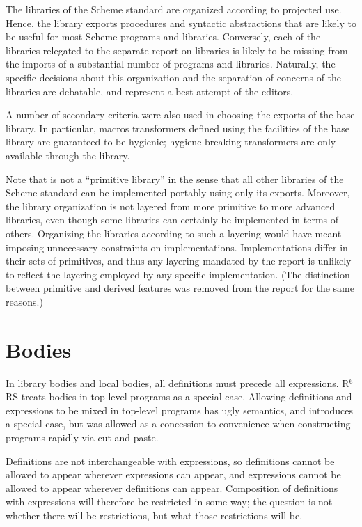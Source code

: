 \documentclass[twoside,twocolumn]{algol60}
\newcommand{\rn}[1]{R$^{#1}$RS}
\begin{document}
The libraries of the Scheme standard are organized according to
projected use.  Hence, the  library exports
procedures and syntactic abstractions that are likely to be useful for
most Scheme programs and libraries.  Conversely, each of the libraries
relegated to the separate report on libraries is likely to be missing
from the imports of a substantial number of programs and libraries.
Naturally, the specific decisions about this organization and the
separation of concerns of the libraries are debatable, and represent a
best attempt of the editors.

A number of secondary criteria were also used in choosing the exports
of the base library.  In particular, macros transformers defined using
the facilities of the base library are guaranteed to be hygienic;
hygiene-breaking transformers are only available through the
 library.

Note that  is not a ``primitive library'' in the
sense that all other libraries of the Scheme standard can be
implemented portably using only its exports.  Moreover, the library
organization is not layered from more primitive to more advanced
libraries, even though some libraries can certainly be implemented in
terms of others.  Organizing the libraries according to such a
layering would have meant imposing unnecessary constraints on
implementations.  Implementations differ in their sets of primitives,
and thus any layering mandated by the report is unlikely to reflect
the layering employed by any specific implementation.  (The
distinction between primitive and derived features was removed from
the report for the same reasons.)

\section{Bodies}

In library bodies and local bodies, all definitions must precede all
expressions. \rn{6} treats bodies in top-level programs as a special
case.  Allowing definitions and expressions to be mixed in top-level
programs has ugly semantics, and introduces a special case, but was
allowed as a concession to convenience when constructing programs
rapidly via cut and paste.

Definitions are not interchangeable with expressions, so definitions
cannot be allowed to appear wherever expressions can appear, and
expressions cannot be allowed to appear wherever definitions can
appear.  Composition of definitions with expressions will therefore be
restricted in some way; the question is not whether there will be
restrictions, but what those restrictions will be.
\end{document}
